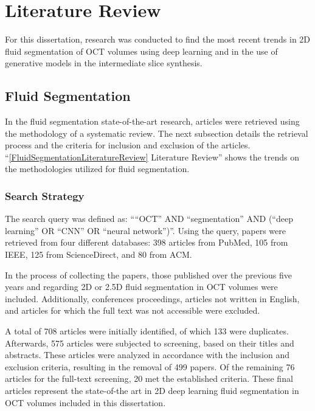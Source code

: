 \chapter{Literature Review}\label{LiteratureReview}
For this dissertation, research was conducted to find the most recent trends in 2D fluid segmentation of OCT volumes using deep learning and in the use of generative models in the intermediate slice synthesis.
\section{Fluid Segmentation}
In the fluid segmentation state-of-the-art research, articles were retrieved using the methodology of a systematic review. The next subsection details the retrieval process and the criteria for inclusion and exclusion of the articles. ``\ref{FluidSegmentationLiteratureReview} Literature Review'' shows the trends on the methodologies utilized for fluid segmentation.
\subsection{Search Strategy}\label{SearchStrategy}
The search query was defined as: ````OCT'' AND ``segmentation'' AND (``deep learning'' OR ``CNN'' OR ``neural network'')''. Using the query, papers were retrieved from four different databases: 398 articles from PubMed, 105 from IEEE, 125 from ScienceDirect, and 80 from ACM.
\par
In the process of collecting the papers, those published over the previous five years and regarding 2D or 2.5D fluid segmentation in OCT volumes were included. Additionally, conferences proceedings, articles not written in English, and articles for which the full text was not accessible were excluded.
\par
A total of 708 articles were initially identified, of which 133 were duplicates. Afterwards, 575 articles were subjected to screening, based on their titles and abstracts. These articles were analyzed in accordance with the inclusion and exclusion criteria, resulting in the removal of 499 papers. Of the remaining 76 articles for the full-text screening, 20 met the established criteria. These final articles represent the state-of-the art in 2D deep learning fluid segmentation in OCT volumes included in this dissertation.

